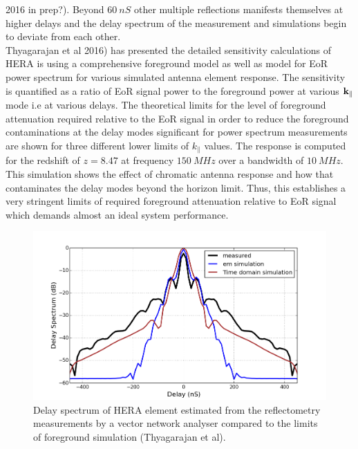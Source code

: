 \documentclass[twocolumn]{emulateapj}
\begin{document}
2016 in prep?). Beyond $60~nS$ other multiple reflections manifests themselves
at higher delays and the delay spectrum of the measurement and simulations
begin to deviate from each other.\\ Thyagarajan et al 2016) has presented the
detailed sensitivity calculations of HERA is using a comprehensive foreground
model as well as model for EoR power spectrum for various simulated antenna
element response. The sensitivity is quantified as a ratio of EoR signal power
to the foreground power at various $\bold k_{\parallel}$ mode i.e at various
delays. The theoretical limits for the level of foreground attenuation required
relative to the EoR signal in order to reduce the foreground contaminations at
the delay modes significant for power spectrum measurements are shown for three
different lower limits of $k_\parallel$ values.  The response is computed for
the redshift of $z=8.47$ at frequency $150~MHz$ over a bandwidth of $10~MHz$.
This simulation shows the effect of chromatic antenna response and how that
contaminates the delay modes beyond the horizon limit. Thus, this establishes a
very stringent limits of required foreground attenuation relative to EoR signal
which demands almost an ideal system performance. \\


\begin{figure}
\centering
\includegraphics[width=\linewidth]{GB_reflectometry_part3/plot/simulation_comparison.png}
\caption{Delay spectrum of HERA element estimated from the reflectometry measurements by a vector network analyser compared to the limits of foreground simulation (Thyagarajan et al).}
\label{fig:sim_fg_Nithya}
\end{figure}
\end{document}
